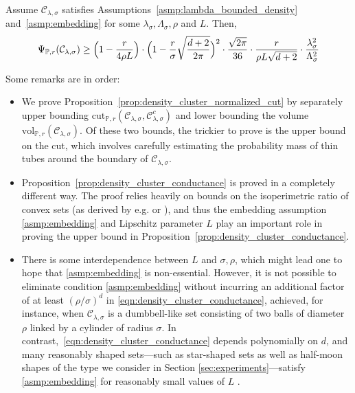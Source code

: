\documentclass[11pt,twoside]{article}
\newcommand{\1}{\mathbf{1}}
\newcommand{\mc}[1]{\mathcal{#1}}
\newcommand{\Pbb}{\mathbb{P}}
\newcommand{\vol}{\mathrm{vol}}
\newcommand{\cut}{\mathrm{cut}}
\begin{document}
\begin{proposition}
	\label{prop:density_cluster_conductance}
	Assume $\mc{C}_{\lambda,\sigma}$ satisfies Assumptions~\ref{asmp:lambda_bounded_density} and~\ref{asmp:embedding} for some $\lambda_{\sigma}, \Lambda_{\sigma}, \rho$ and $L$. Then,
	\begin{equation}
	\label{eqn:density_cluster_conductance}
	\Psi_{\Pbb,r}(\mc{C}_{\lambda,\sigma}) \geq \Bigl(1 - \frac{r}{4\rho L}\Bigr) \cdot \Bigl(1 - \frac{r}{\sigma}\sqrt{\frac{d + 2}{2\pi}}\Bigr)^2 \cdot \frac{\sqrt{2\pi}}{36} \cdot \frac{r}{\rho L \sqrt{d + 2}} \cdot \frac{\lambda_{\sigma}^2}{\Lambda_{\sigma}^2}
	\end{equation}
\end{proposition}
Some remarks are in order:
\begin{itemize}
	\item We prove Proposition~\ref{prop:density_cluster_normalized_cut} by separately upper bounding $\cut_{\Pbb,r}(\mc{C}_{\lambda,\sigma}, \mc{C}_{\lambda,\sigma}^c)$ and lower bounding the volume $\vol_{\Pbb,r}(\mc{C}_{\lambda,\sigma})$. Of these two bounds, the trickier to prove is the upper bound on the cut, which involves carefully estimating the probability mass of thin tubes around the boundary of $\mc{C}_{\lambda,\sigma}$. 
	\item Proposition~\ref{prop:density_cluster_conductance} is proved in a completely different way. The proof relies heavily on bounds on the isoperimetric ratio of convex sets (as derived by e.g. \cite{lovasz1990} or \cite{dyer1991}), and thus the embedding assumption \ref{asmp:embedding} and Lipschitz parameter $L$
	play an important role in proving the upper bound in Proposition~\ref{prop:density_cluster_conductance}. 
	\item There is some interdependence between $L$ and $\sigma,\rho$, which might lead one to hope that \ref{asmp:embedding} is
	non-essential. However, it is not possible to eliminate condition \ref{asmp:embedding} without incurring an additional factor of at least
	$(\rho/\sigma)^d$ in \eqref{eqn:density_cluster_conductance}, achieved, for
	instance, when $\mc{C}_{\lambda,\sigma}$ is a dumbbell-like set consisting of two balls of diameter $\rho$ linked by a cylinder of radius $\sigma$. In contrast,~\eqref{eqn:density_cluster_conductance} depends polynomially on $d$, and many reasonably shaped sets---such as star-shaped sets as well as half-moon shapes of the type we consider in Section \ref{sec:experiments}---satisfy \ref{asmp:embedding} for reasonably small values of $L$ \citep{abbasi-yadkori2016a, abbasi-yadkori2016}.
\end{itemize}
\end{document}

